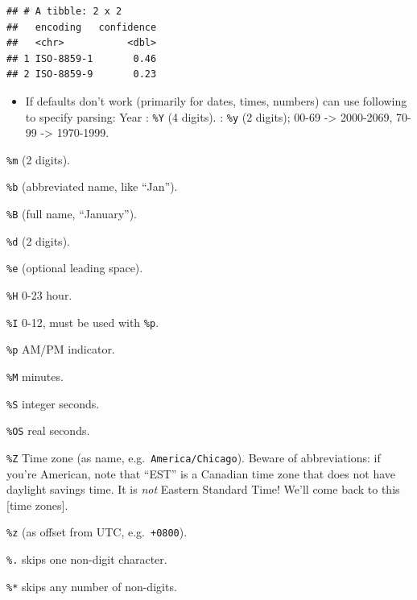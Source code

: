 \documentclass[]{book}
\providecommand{\tightlist}{%
  \setlength{\itemsep}{0pt}\setlength{\parskip}{0pt}}
\theoremstyle{definition}
\theoremstyle{definition}
\theoremstyle{definition}
\theoremstyle{remark}
\begin{document}
\begin{verbatim}
## # A tibble: 2 x 2
##   encoding   confidence
##   <chr>           <dbl>
## 1 ISO-8859-1       0.46
## 2 ISO-8859-9       0.23
\end{verbatim}

\begin{itemize}
\tightlist
\item
  If defaults don't work (primarily for dates, times, numbers) can use
  following to specify parsing: Year : \texttt{\%Y} (4 digits). :
  \texttt{\%y} (2 digits); 00-69 -\textgreater{} 2000-2069, 70-99
  -\textgreater{} 1970-1999.
\end{itemize}

\begin{description}
\tightlist
\item[Month]
\texttt{\%m} (2 digits).

\texttt{\%b} (abbreviated name, like ``Jan'').

\texttt{\%B} (full name, ``January'').
\item[Day]
\texttt{\%d} (2 digits).

\texttt{\%e} (optional leading space).
\item[Time]
\texttt{\%H} 0-23 hour.

\texttt{\%I} 0-12, must be used with \texttt{\%p}.

\texttt{\%p} AM/PM indicator.

\texttt{\%M} minutes.

\texttt{\%S} integer seconds.

\texttt{\%OS} real seconds.

\texttt{\%Z} Time zone (as name, e.g.~\texttt{America/Chicago}). Beware
of abbreviations: if you're American, note that ``EST'' is a Canadian
time zone that does not have daylight savings time. It is \emph{not}
Eastern Standard Time! We'll come back to this {[}time zones{]}.

\texttt{\%z} (as offset from UTC, e.g.~\texttt{+0800}).
\item[Non-digits]
\texttt{\%.} skips one non-digit character.

\texttt{\%*} skips any number of non-digits.
\end{description}
\end{document}
